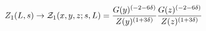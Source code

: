 \begin{equation} 
Z_1(L,s) \to {\cal Z}_1(x,y,z;s,L)  = 
\frac{G(y)^{(-2-6\delta)}}{Z(y)^{(1+3\delta)}}
\frac{G(z)^{(-2-6\delta)}}{Z(z)^{(1+3\delta)}}
\end{equation}

